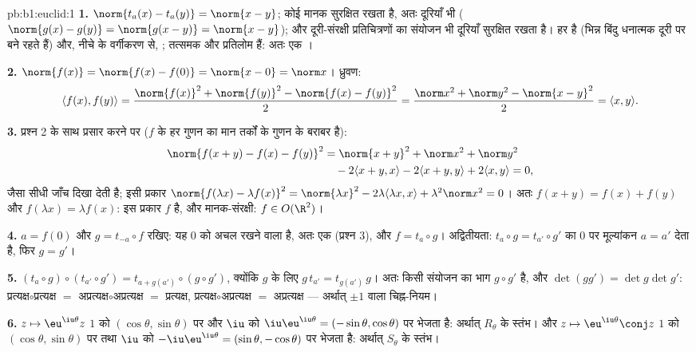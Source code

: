 \begin{solution}{pb:b1:euclid:1}
\textbf{1.} $\norm{t_a(x) - t_a(y)} = \norm{x - y}$; कोई   मानक
सुरक्षित रखता है, अतः दूरियाँ भी ($\norm{g(x) - g(y)} = \norm{g(x - y)} =
\norm{x-y}$); और दूरी-संरक्षी प्रतिचित्रणों का संयोजन भी दूरियाँ सुरक्षित
रखता है। हर   है (भिन्न बिंदु धनात्मक दूरी पर बने रहते हैं) और,
नीचे के वर्गीकरण से, ; तत्समक और प्रतिलोम  हैं: अतः एक
।

\textbf{2.} $\norm{f(x)} = \norm{f(x) - f(0)} = \norm{x - 0} = \norm x$।
ध्रुवण:
\[
\langle f(x), f(y)\rangle
= \frac{\norm{f(x)}^2 + \norm{f(y)}^2 - \norm{f(x) -
f(y)}^2}{2}
= \frac{\norm x^2 + \norm y^2 - \norm{x - y}^2}{2}
= \langle x, y\rangle .
\]

\textbf{3.} प्रश्न 2 के साथ प्रसार करने पर ($f$ के हर गुणन का मान तर्कों के
गुणन के बराबर है):
\begin{align*}
\norm{f(x+y) - f(x) - f(y)}^2
&= \norm{x+y}^2 + \norm x^2 + \norm y^2\\
&\quad - 2\langle x+y, x\rangle - 2\langle x+y, y\rangle
+ 2\langle x, y\rangle = 0 ,
\end{align*}
जैसा सीधी जाँच दिखा देती है; इसी प्रकार $\norm{f(\lambda x) - \lambda
f(x)}^2 = \norm{\lambda x}^2 - 2\lambda\langle \lambda x, x\rangle +
\lambda^2\norm x^2 = 0$। अतः $f(x + y) = f(x) + f(y)$ और $f(\lambda x) =
\lambda f(x)$: इस प्रकार $f$  है, और मानक-संरक्षी: $f \in O(\R^2)$।

\textbf{4.} $a = f(0)$ और $g = t_{-a}\circ f$ रखिए: यह $0$ को अचल रखने वाला
 है, अतः एक   (प्रश्न 3), और $f = t_a \circ g$। अद्वितीयता:
$t_a \circ g = t_{a'}\circ g'$ का $0$ पर मूल्यांकन $a = a'$ देता है, फिर $g
= g'$।

\textbf{5.} $(t_a\circ g)\circ(t_{a'}\circ g') = t_{a + g(a')}\circ(g\circ
g')$, क्योंकि  $g$ के लिए $g\,t_{a'} = t_{g(a')}\,g$। अतः किसी संयोजन
का  भाग $g \circ g'$ है, और $\det(gg') = \det g \det g'$:
प्रत्यक्ष$\circ$प्रत्यक्ष $=$ अप्रत्यक्ष$\circ$अप्रत्यक्ष $=$ प्रत्यक्ष,
प्रत्यक्ष$\circ$अप्रत्यक्ष $=$ अप्रत्यक्ष --- अर्थात् $\pm1$ वाला
चिह्न-नियम।

\textbf{6.} $z \mapsto \eu^{\iu\theta}z$ $1$ को $(\cos\theta, \sin\theta)$
पर और $\iu$ को $\iu\eu^{\iu\theta} = (-\sin\theta, \cos\theta)$ पर भेजता है:
अर्थात् $R_\theta$ के स्तंभ। और $z \mapsto \eu^{\iu\theta}\conj z$ $1$ को
$(\cos\theta, \sin\theta)$ पर तथा $\iu$ को $-\iu\eu^{\iu\theta} =
(\sin\theta, -\cos\theta)$ पर भेजता है: अर्थात् $S_\theta$ के स्तंभ।


\end{solution}
